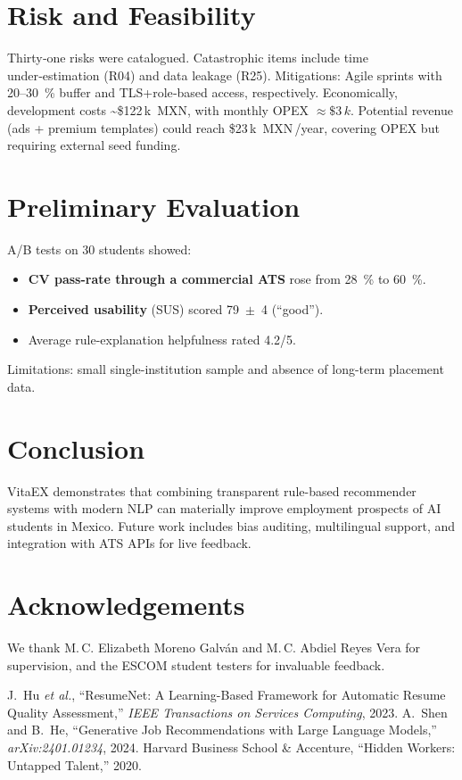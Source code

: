 \documentclass[12pt,a4paper]{article}
\begin{document}
	\section{Risk and Feasibility}
	Thirty‑one risks were catalogued. Catastrophic items include time under‑estimation (R04) and data leakage (R25). Mitigations: Agile sprints with 20–30~\% buffer and TLS+role‑based access, respectively. Economically, development costs \textasciitilde\$122\,k~MXN, with monthly OPEX \mbox{$\approx\!\$3\,k$}. Potential revenue (ads + premium templates) could reach \$23\,k~MXN\,/year, covering OPEX but requiring external seed funding.
	
	\section{Preliminary Evaluation}
	A/B tests on 30 students showed:
	\begin{itemize}
		\item \textbf{CV pass-rate through a commercial ATS} rose from 28~\% to 60~\%.
		\item \textbf{Perceived usability} (SUS) scored 79~$\pm$~4 (“good”).
		\item Average rule-explanation helpfulness rated 4.2/5.
	\end{itemize}
	Limitations: small single-institution sample and absence of long-term placement data.
	
	\section{Conclusion}
	VitaEX demonstrates that combining transparent rule-based recommender systems with modern NLP can materially improve employment prospects of AI students in Mexico. Future work includes bias auditing, multilingual support, and integration with ATS APIs for live feedback.
	
	\section*{Acknowledgements}
	We thank M.\,C. Elizabeth Moreno Galván and M.\,C. Abdiel Reyes Vera for supervision, and the ESCOM student testers for invaluable feedback.
	
	\begin{thebibliography}{9}
		 J.~Hu \emph{et al.}, ``ResumeNet: A Learning-Based Framework for Automatic Resume Quality Assessment,'' \emph{IEEE Transactions on Services Computing}, 2023.
		 A.~Shen and B.~He, ``Generative Job Recommendations with Large Language Models,'' \emph{arXiv:2401.01234}, 2024.
		 Harvard Business School \& Accenture, ``Hidden Workers: Untapped Talent,'' 2020.
	\end{thebibliography}
	
\end{document}
